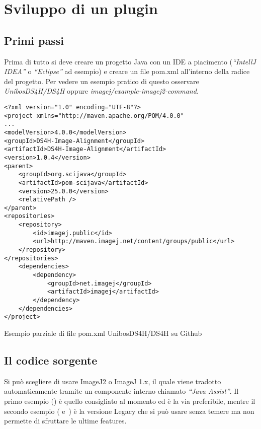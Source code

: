 \section{Sviluppo di un plugin}

\subsection{Primi passi}
\noindent Prima di tutto si deve creare un progetto Java con un IDE a piacimento (\textit{``IntellJ IDEA''} o \textit{``Eclipse''} ad esempio) e creare un file pom.xml all'interno della radice del progetto. Per vedere un esempio pratico di questo osservare \textit{UnibosDS4H/DS4H} oppure \textit{imagej/example-imagej2-command}.

\begin{listing}[H]
\begin{verbatim}
<?xml version="1.0" encoding="UTF-8"?>
<project xmlns="http://maven.apache.org/POM/4.0.0"
...
<modelVersion>4.0.0</modelVersion>
<groupId>DS4H-Image-Alignment</groupId>
<artifactId>DS4H-Image-Alignment</artifactId>
<version>1.0.4</version>
<parent>
    <groupId>org.scijava</groupId>
    <artifactId>pom-scijava</artifactId>
    <version>25.0.0</version>
    <relativePath />
</parent>
<repositories>
    <repository>
        <id>imagej.public</id>
        <url>http://maven.imagej.net/content/groups/public</url>
    </repository>
</repositories>
    <dependencies>
        <dependency>
            <groupId>net.imagej</groupId>
            <artifactId>imagej</artifactId>
        </dependency>
    </dependencies>
</project>
\end{verbatim}
\caption{Esempio parziale di file pom.xml UnibosDS4H/DS4H su Github} \label{lst:pom}
\end{listing}

\subsection{Il codice sorgente}
\noindent Si può scegliere di usare ImageJ2 o ImageJ 1.x, il quale viene tradotto automaticamente tramite un componente interno chiamato \textit{``Java Assist''}. Il primo esempio () è quello consigliato al momento ed è la via preferibile, mentre il secondo esempio ( e~) è la versione Legacy che si può usare senza temere ma non permette di sfruttare le ultime features.


